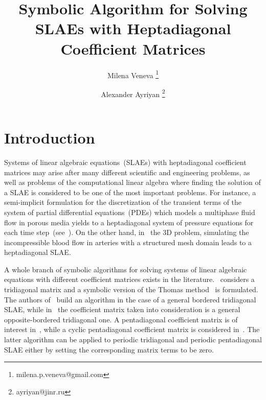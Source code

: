 \documentclass[11pt, a4paper]{article}
\title{Symbolic Algorithm for Solving SLAEs with Heptadiagonal
Coefficient Matrices}
\author[1]{Milena Veneva \thanks{milena.p.veneva@gmail.com}}
\author[1]{Alexander Ayriyan \thanks{ayriyan@jinr.ru}}
\affil[1]{Joint Institute for Nuclear Research, Laboratory of Information 
Technologies, Joliot-Curie 6, 141980 Dubna, Moscow region, Russia}
\date{}
\begin{document}
\maketitle
{}
%
\maketitle
%

\section{Introduction}

Systems of linear algebraic equations~(SLAEs) with heptadiagonal coefficient
matrices may arise after many different scientific and engineering problems,
as well as problems of the computational linear algebra where finding the
solution of a SLAE is considered to be one of the most important problems.
For instance, a semi-implicit formulation for the discretization of the
transient terms of the system of partial differential equations~(PDEs) which
models a multiphase fluid flow in porous media yields to a heptadiagonal system
of pressure equations for each time step~(see~\cite{Kim}). On the other hand,
in~\cite{Duran} the 3D problem, simulating the incompressible blood flow in
arteries with a structured mesh domain leads to a heptadiagonal SLAE.

A whole branch of symbolic algorithms for solving systems of linear algebraic
equations with different coefficient matrices exists in the literature.
\cite{El-Mikkawy}~considers a tridiagonal matrix and a symbolic version of the
Thomas method~\cite{Higham} is formulated. The authors of~\cite{Karawia_2013a}
build an algorithm in the case of a general bordered tridiagonal SLAE, while
in~\cite{Atlan} the coefficient matrix taken into consideration is a general
opposite-bordered tridiagonal one. A pentadiagonal coefficient matrix is of
interest in~\cite{Askar}, while a cyclic pentadiagonal coefficient matrix is
considered in~\cite{Jia}. The latter algorithm can be applied to periodic
tridiagonal and periodic pentadiagonal SLAE either by setting the corresponding
matrix terms to be zero.
\end{document}
